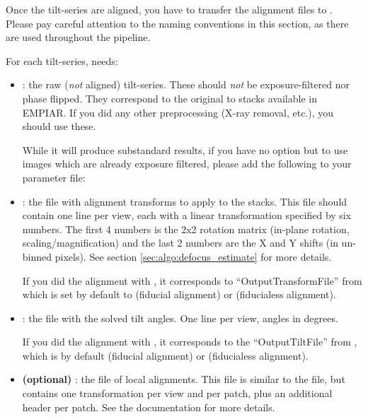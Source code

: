 Once the tilt-series are aligned, you have to transfer the alignment files to {\emClarity}. Please pay careful attention to the naming conventions in this section, as there are used throughout the pipeline.

For each tilt-series, {\emClarity} needs:

\begin{itemize}
    \item {}: the raw (\textit{not} aligned) tilt-series. These should \textit{not} be exposure-filtered nor phase flipped. They correspond to the original  to  stacks available in EMPIAR. If you did any other preprocessing (X-ray removal, etc.), you should use these.
    
    \begin{note}While it will produce substandard results, if you have no option but to use images which are already exposure filtered, please add the following to your parameter file: 
    \end{note}
    
    \item {}: the file with alignment transforms to apply to the  stacks. This file should contain one line per view, each with a linear transformation specified by six numbers. The first 4 numbers is the 2x2 rotation matrix (in-plane rotation, scaling/magnification) and the last 2 numbers are the X and Y shifts (in un-binned pixels). See section \ref{sec:algo:defocus_estimate} for more details.
    
    If you did the alignment with {\ETomo}, it corresponds to ``OutputTransformFile'' from {\tiltalign} which is set by default to  (fiducial alignment) or  (fiducialess alignment).
    
    \item {}: the file with the solved tilt angles. One line per view, angles in degrees.
    
    If you did the alignment with {\ETomo}, it corresponds to the ``OutputTiltFile'' from {\tiltalign}, which is by default  (fiducial alignment) or  (fiducialess alignment).
    
    \item \textbf{(optional)} : the file of local alignments. This file is similar to the  file, but contains one transformation per view and per patch, plus an additional header per patch. See the {\tiltalign} documentation for more details.
    

\end{itemize}
